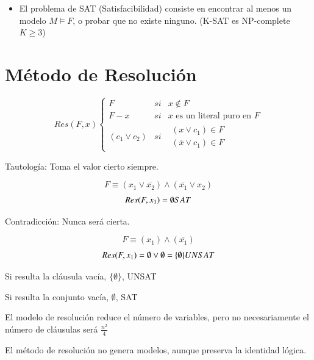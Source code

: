 \documentclass[12pt, twoside, openright]{report} %
\begin{document}
\begin{itemize}
	\item El problema de SAT (Satisfacibilidad) consiste en encontrar al menos
	      un modelo \(M \models F\), o probar que no existe ninguno. (K-SAT es
	      NP-complete \(K \geq 3\))
\end{itemize}
\vspace{-0.5cm}
\section{Método de Resolución}
\vspace{-0.5cm}
$$Res(F,x)\left\{\begin{matrix}
		F              & si & x\notin F                          \\
		F-x            & si & x \text{ es un literal puro en } F \\
		(c_1 \vee c_2) & si & \begin{matrix}  (x \vee c_1) \in F            \\
			(\overline{x} \vee c_1) \in F\end{matrix}\end{matrix}\right.$$

Tautología: Toma el valor cierto siempre.
\vspace{-0.5cm}


$$F \equiv (x_1 \vee \overline{x_2})\wedge (\overline{x_1} \vee x_2)$$
$$Res(F,x_1)= \emptyset \space SAT$$

Contradicción: Nunca será cierta.
\vspace{-0.5cm}

$$F \equiv (x_1)\wedge (\overline{x_1})$$
$$Res(F,x_1)= \emptyset \vee \emptyset = \{ \emptyset \} \space UNSAT$$


Si resulta la cláusula vacía, \(\{ \emptyset \}\), UNSAT


Si resulta la conjunto vacía, \(\emptyset\), SAT

El modelo de resolución reduce el número de variables, pero no
necesariamente el número de cláusulas será \(\frac {n^2} {4}\)


El método de resolución no genera modelos, aunque preserva la
identidad lógica.
\end{document}
